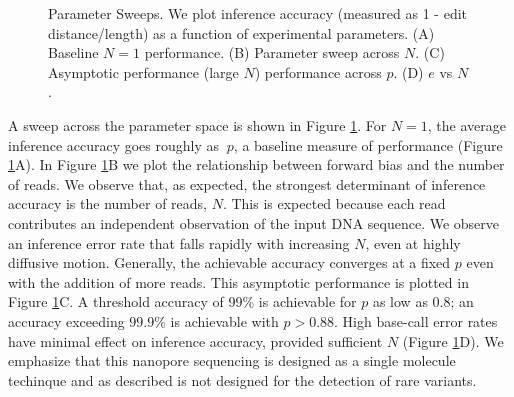 \documentclass{biophys_letter}
\begin{document}
\begin{figure}
\caption{Parameter Sweeps. We plot inference accuracy (measured as 1 - edit distance/length) as a function of experimental parameters. (A) Baseline $N=1$ performance. (B) Parameter sweep across $N$. (C) Asymptotic performance (large $N$) performance across $p$. (D) $e$ vs $N$.}
\label{fig:parameter_sweeps}
\end{figure}

A sweep across the parameter space is shown in Figure \ref{fig:parameter_sweeps}.
For $N=1$, the average inference accuracy goes roughly as $~p$, a baseline measure of performance (Figure \ref{fig:parameter_sweeps}A).
In Figure \ref{fig:parameter_sweeps}B we plot the relationship between forward bias and the number of reads.
We observe that, as expected, the strongest determinant of inference accuracy is the number of reads, $N$.
This is expected because each read contributes an independent observation of the input DNA sequence.
We observe an inference error rate that falls rapidly with increasing $N$, even at highly diffusive motion. 
Generally, the achievable accuracy converges at a fixed $p$ even with the addition of more reads.
This asymptotic performance is plotted in Figure \ref{fig:parameter_sweeps}C. A threshold accuracy of 99\% is achievable for $p$ as low as $0.8$; an accuracy exceeding $99.9\%$ is achievable with $p>0.88$.
High base-call error rates have minimal effect on inference accuracy, provided sufficient $N$ (Figure \ref{fig:parameter_sweeps}D).
We emphasize that this nanopore sequencing is designed as a single molecule techinque and as described is not designed for the detection of rare variants.

\end{document}
